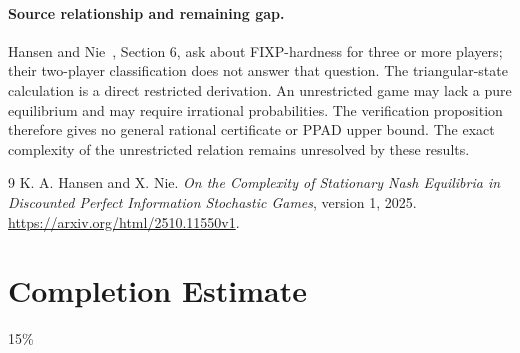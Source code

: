 \documentclass[11pt]{article}
\theoremstyle{definition}
\theoremstyle{remark}
\begin{document}
\paragraph{Source relationship and remaining gap.}
Hansen and Nie~\cite{source}, Section 6, ask about FIXP-hardness for three or more players; their two-player classification does not answer that question. The triangular-state calculation is a direct restricted derivation. An unrestricted game may lack a pure equilibrium and may require irrational probabilities. The verification proposition therefore gives no general rational certificate or PPAD upper bound. The exact complexity of the unrestricted relation remains unresolved by these results.

\begin{thebibliography}{9}
 K. A. Hansen and X. Nie.
\emph{On the Complexity of Stationary Nash Equilibria in Discounted Perfect Information Stochastic Games}, version 1, 2025.
\url{https://arxiv.org/html/2510.11550v1}.
\end{thebibliography}

\section{Completion Estimate}
15\%
\end{document}
